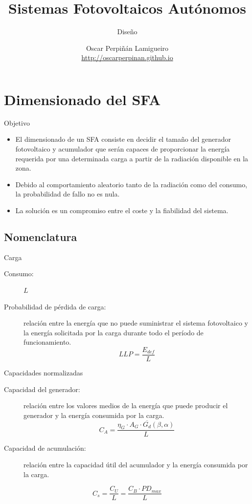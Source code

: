 \documentclass[xcolor={usenames,svgnames,dvipsnames}]{beamer}
\author{Oscar Perpiñán Lamigueiro \\ \url{http://oscarperpinan.github.io}}
\date{}
\title{Sistemas Fotovoltaicos Autónomos}
\subtitle{Diseño}
\begin{document}
\maketitle

\section{Dimensionado del SFA}
\label{sec:org5d06901}
\begin{frame}[label={sec:orgceca8b9}]{Objetivo}
\begin{itemize}
\item El dimensionado de un SFA consiste en \alert{decidir el tamaño del
generador fotovoltaico y acumulador} que serán capaces de
\alert{proporcionar la energía requerida} por una determinada carga a partir
de la \alert{radiación disponible} en la zona.

\item Debido al comportamiento aleatorio tanto de la radiación como del
consumo, la \alert{probabilidad de fallo no es nula}.

\item La solución es un compromiso entre el coste y la fiabilidad del
sistema.
\end{itemize}
\end{frame}


\subsection{Nomenclatura}
\label{sec:org0effe48}
\begin{frame}[label={sec:org57c246b}]{Carga}
\begin{description}
\item[{Consumo:}] \(L\)

\item[{Probabilidad de pérdida de carga:}] relación entre la energía que no
puede suministrar el sistema fotovoltaico y la energía solicitada por
la carga durante todo el período de
funcionamiento.$$LLP=\frac{E_{def}}{L}$$
\end{description}
\end{frame}

\begin{frame}[label={sec:org2ec6f2e}]{Capacidades normalizadas}
\begin{description}
\item[{Capacidad del generador:}] relación entre los valores medios de la
energía que puede producir el generador y la energía consumida por la
carga.
$$C_{A}=\frac{\eta_{G}\cdot A_{G}\cdot\overline{G_{d}}(\beta,\alpha)}{L}$$

\item[{Capacidad de acumulación:}] relación entre la capacidad útil del acumulador y la energía consumida por la carga.
\end{description}
$$C_{s}=\frac{C_{U}}{L}=\frac{C_{B}\cdot PD_{max}}{L}$$
\end{frame}
\end{document}
